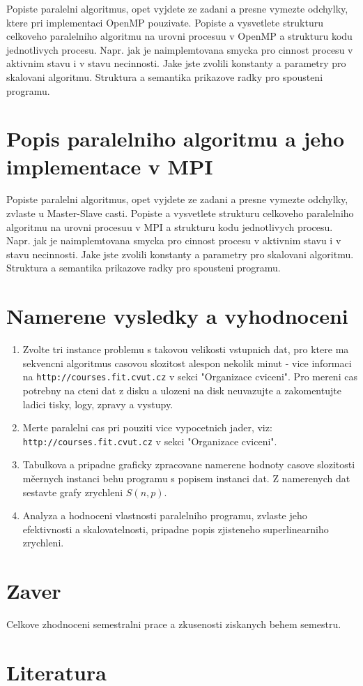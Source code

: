 Popiste paralelni algoritmus, opet vyjdete ze zadani a presne vymezte
odchylky, ktere pri implementaci OpenMP pouzivate.
Popiste a vysvetlete strukturu celkoveho
paralelniho algoritmu na urovni procesuu v OpenMP a strukturu kodu
jednotlivych procesu. Napr. jak je naimplemtovana smycka pro cinnost
procesu v aktivnim stavu i v stavu necinnosti. Jake jste zvolili
konstanty a parametry pro skalovani algoritmu. Struktura a semantika
prikazove radky pro spousteni programu.

\section{Popis paralelniho algoritmu a jeho implementace v MPI}

Popiste paralelni algoritmus, opet vyjdete ze zadani a presne vymezte
odchylky, zvlaste u Master-Slave casti. Popiste a vysvetlete strukturu celkoveho
paralelniho algoritmu na urovni procesuu v MPI a strukturu kodu
jednotlivych procesu. Napr. jak je naimplemtovana smycka pro cinnost
procesu v aktivnim stavu i v stavu necinnosti. Jake jste zvolili
konstanty a parametry pro skalovani algoritmu. Struktura a semantika
prikazove radky pro spousteni programu.

\section{Namerene vysledky a vyhodnoceni}

\begin{enumerate}
\item Zvolte tri instance problemu s takovou velikosti vstupnich dat, pro ktere ma sekvencni 
algoritmus casovou slozitost alespon nekolik minut - vice informaci na {\tt http://courses.fit.cvut.cz} v sekci "Organizace cviceni".
Pro mereni cas potrebny na cteni dat z disku a ulozeni na disk neuvazujte a zakomentujte
ladici tisky, logy, zpravy a vystupy.
\item Merte paralelni cas pri pouziti vice vypocetnich jader, viz: {\tt http://courses.fit.cvut.cz} v sekci "Organizace cviceni".
\item Tabulkova a pripadne graficky zpracovane namerene hodnoty casove slozitosti měernych instanci behu programu s popisem instanci dat. Z namerenych dat sestavte grafy zrychleni $S(n,p)$. 
\item Analyza a hodnoceni vlastnosti paralelniho programu, zvlaste jeho efektivnosti a skalovatelnosti, pripadne popis zjisteneho superlinearniho zrychleni.

\end{enumerate}

\section{Zaver}

Celkove zhodnoceni semestralni prace a zkusenosti ziskanych behem semestru.

\section{Literatura}



